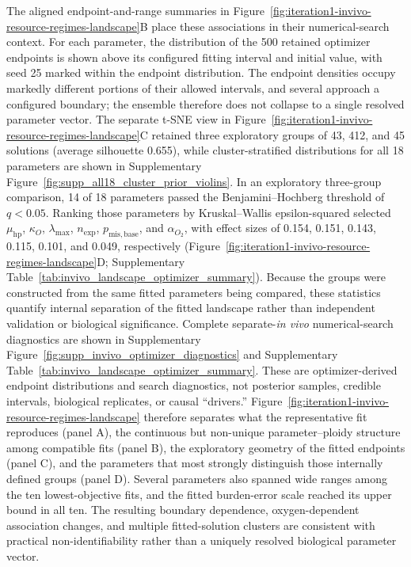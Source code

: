\documentclass[11pt]{article}
\begin{document}
The aligned endpoint-and-range summaries in Figure~\ref{fig:iteration1-invivo-resource-regimes-landscape}B place these associations in their numerical-search context. For each parameter, the distribution of the 500 retained optimizer endpoints is shown above its configured fitting interval and initial value, with seed 25 marked within the endpoint distribution. The endpoint densities occupy markedly different portions of their allowed intervals, and several approach a configured boundary; the ensemble therefore does not collapse to a single resolved parameter vector. The separate t-SNE view in Figure~\ref{fig:iteration1-invivo-resource-regimes-landscape}C retained three exploratory groups of 43, 412, and 45 solutions (average silhouette 0.655), while cluster-stratified distributions for all 18 parameters are shown in Supplementary Figure~\ref{fig:supp_all18_cluster_prior_violins}. In an exploratory three-group comparison, 14 of 18 parameters passed the Benjamini--Hochberg threshold of \(q<0.05\). Ranking those parameters by Kruskal--Wallis epsilon-squared selected \(\mu_{\mathrm{hp}}\), \(\kappa_O\), \(\lambda_{\max}\), \(n_{\mathrm{exp}}\), \(p_{\mathrm{mis,base}}\), and \(\alpha_{O_2}\), with effect sizes of 0.154, 0.151, 0.143, 0.115, 0.101, and 0.049, respectively (Figure~\ref{fig:iteration1-invivo-resource-regimes-landscape}D; Supplementary Table~\ref{tab:invivo_landscape_optimizer_summary}). Because the groups were constructed from the same fitted parameters being compared, these statistics quantify internal separation of the fitted landscape rather than independent validation or biological significance. Complete separate-\textit{in vivo} numerical-search diagnostics are shown in Supplementary Figure~\ref{fig:supp_invivo_optimizer_diagnostics} and Supplementary Table~\ref{tab:invivo_landscape_optimizer_summary}. These are optimizer-derived endpoint distributions and search diagnostics, not posterior samples, credible intervals, biological replicates, or causal ``drivers.'' Figure~\ref{fig:iteration1-invivo-resource-regimes-landscape} therefore separates what the representative fit reproduces (panel A), the continuous but non-unique parameter--ploidy structure among compatible fits (panel B), the exploratory geometry of the fitted endpoints (panel C), and the parameters that most strongly distinguish those internally defined groups (panel D). Several parameters also spanned wide ranges among the ten lowest-objective fits, and the fitted burden-error scale reached its upper bound in all ten. The resulting boundary dependence, oxygen-dependent association changes, and multiple fitted-solution clusters are consistent with practical non-identifiability rather than a uniquely resolved biological parameter vector.
\end{document}
